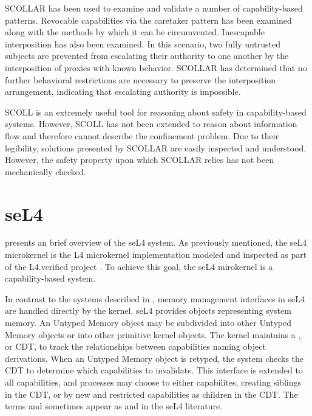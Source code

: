 SCOLLAR has been used to examine and validate a number of capability-based patterns.
Revocable capabilities via the caretaker pattern has been examined along with the methods by which it can be circumvented.
Inescapable interposition has also been examined.
In this scenario, two fully untrusted subjects are prevented from escalating their authority to one another by the interposition of proxies with known behavior.
SCOLLAR has determined that no further behavioral restrictions are necessary to preserve the interposition arrangement, indicating that escalating authority is impossible.

SCOLL is an extremely useful tool for reasoning about safety in capability-based systems.
However, SCOLL has not been extended to reason about information flow and therefore cannot describe the confinement problem.
Due to their legibility, solutions presented by SCOLLAR are easily inspected and understood.
However, the safety property upon which SCOLLAR relies has not been mechanically checked.

\section{seL4}

 presents an brief overview of the seL4 system.
As previously mentioned, the seL4 microkernel \cite{Elphinstone:formalisingukernel} is the L4 microkernel \cite{Liedtke:1996:TRM} implementation modeled and inspected as part of the L4.verified project \cite{Klein:l4.verified}.
To achieve this goal, the seL4 mirokernel is a capability-based system.

In contrast to the systems described in , memory management interfaces in seL4 are handled directly by the kernel.
seL4 provides  objects representing system memory.
An Untyped Memory object may be subdivided into other Untyped Memory objects or into other primitive kernel objects.
The kernel maintains a , or CDT, to track the relationships between capabilities naming object derivations.
When an Untyped Memory object is retyped, the system checks the CDT to determine which capabilities to invalidate.
This interface is extended to all capabilities, and processes may choose to either  capabilites, creating siblings in the CDT, or by  new and restricted capabilities as children in the CDT.
The terms  and  sometimes appear as  and  in the seL4 literature.

